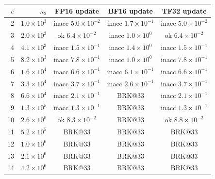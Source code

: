 \begin{tabular}{rr|ccc}
\toprule
$e$ & $\kappa_2$ & FP16 update & BF16 update & TF32 update\\
\midrule
2 & $1.0\!\times\!10^{3}$ & \cellcolor{orange!30}inacc $5.0\!\times\!10^{-2}$ & \cellcolor{orange!30}inacc $1.7\!\times\!10^{-1}$ & \cellcolor{orange!30}inacc $5.0\!\times\!10^{-2}$\\
3 & $2.0\!\times\!10^{3}$ & \cellcolor{green!15}ok $6.4\!\times\!10^{-2}$ & \cellcolor{orange!30}inacc $1.0\!\times\!10^{0}$ & \cellcolor{green!15}ok $6.4\!\times\!10^{-2}$\\
4 & $4.1\!\times\!10^{3}$ & \cellcolor{orange!30}inacc $1.5\!\times\!10^{-1}$ & \cellcolor{orange!30}inacc $1.4\!\times\!10^{0}$ & \cellcolor{orange!30}inacc $1.5\!\times\!10^{-1}$\\
5 & $8.2\!\times\!10^{3}$ & \cellcolor{orange!30}inacc $7.8\!\times\!10^{-1}$ & \cellcolor{orange!30}inacc $1.0\!\times\!10^{0}$ & \cellcolor{orange!30}inacc $7.8\!\times\!10^{-1}$\\
6 & $1.6\!\times\!10^{4}$ & \cellcolor{orange!30}inacc $6.6\!\times\!10^{-1}$ & \cellcolor{orange!30}inacc $6.1\!\times\!10^{-1}$ & \cellcolor{orange!30}inacc $6.6\!\times\!10^{-1}$\\
7 & $3.3\!\times\!10^{4}$ & \cellcolor{orange!30}inacc $3.7\!\times\!10^{-1}$ & \cellcolor{orange!30}inacc $2.6\!\times\!10^{-1}$ & \cellcolor{orange!30}inacc $3.7\!\times\!10^{-1}$\\
8 & $6.6\!\times\!10^{4}$ & \cellcolor{orange!30}inacc $2.1\!\times\!10^{-1}$ & \cellcolor{red!25}BRK@33 & \cellcolor{orange!30}inacc $2.1\!\times\!10^{-1}$\\
9 & $1.3\!\times\!10^{5}$ & \cellcolor{orange!30}inacc $1.3\!\times\!10^{-1}$ & \cellcolor{red!25}BRK@33 & \cellcolor{orange!30}inacc $1.3\!\times\!10^{-1}$\\
10 & $2.6\!\times\!10^{5}$ & \cellcolor{green!15}ok $8.3\!\times\!10^{-2}$ & \cellcolor{red!25}BRK@33 & \cellcolor{green!15}ok $8.8\!\times\!10^{-2}$\\
11 & $5.2\!\times\!10^{5}$ & \cellcolor{red!25}BRK@33 & \cellcolor{red!25}BRK@33 & \cellcolor{red!25}BRK@33\\
12 & $1.0\!\times\!10^{6}$ & \cellcolor{red!25}BRK@33 & \cellcolor{red!25}BRK@33 & \cellcolor{red!25}BRK@33\\
13 & $2.1\!\times\!10^{6}$ & \cellcolor{red!25}BRK@33 & \cellcolor{red!25}BRK@33 & \cellcolor{red!25}BRK@33\\
14 & $4.2\!\times\!10^{6}$ & \cellcolor{red!25}BRK@33 & \cellcolor{red!25}BRK@33 & \cellcolor{red!25}BRK@33\\

\end{tabular}
